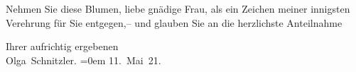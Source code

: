 \pstart
           Nehmen Sie diese Blumen, liebe gnädige Frau, als ein Zeichen meiner innigsten
               Verehrung für Sie entgegen,– und glauben Sie an die herzlichste Anteilnahme{\pb}\pend
           
\pstart
           Ihrer aufrichtig ergebenen{\\[\baselineskip]}\spacefill\mbox{Olga Schnitzler.}\pend
           \leftskip=0em{}
\pstart
           \noindent{}11. Mai 21. \pend
           \endnumbering{}  
      